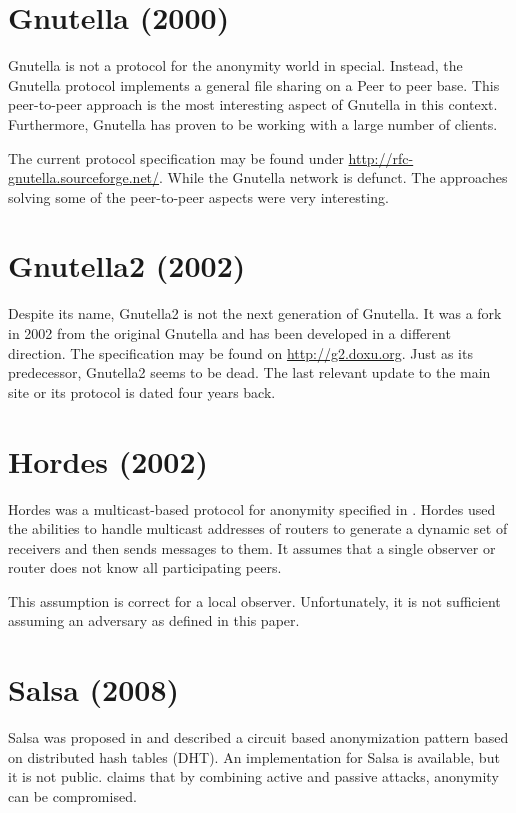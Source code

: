 \section{Gnutella (2000)}
Gnutella is not a protocol for the anonymity world in special. Instead, the Gnutella protocol implements a general file sharing on a Peer to peer base. This peer-to-peer approach is the most interesting aspect of Gnutella in this context. Furthermore, Gnutella has proven to be working with a large number of clients.

The current protocol specification may be found under \href{http://rfc-gnutella.sourceforge.net/developer/stable/index.html}{http://rfc-gnutella.sourceforge.net/}. While the Gnutella network is defunct. The approaches solving some of the peer-to-peer aspects were very interesting.

\section{Gnutella2 (2002)}
Despite its name, Gnutella2 is not the next generation of Gnutella. It was a fork in 2002 from the original Gnutella and has been developed in a different direction. The specification may be found on \url{http://g2.doxu.org}. Just as its predecessor, Gnutella2 seems to be dead. The last relevant update to the main site or its protocol is dated four years back.


\section{Hordes (2002)}
Hordes was a multicast-based protocol for anonymity specified in \cite{Levine:2002}. Hordes used the abilities to handle multicast addresses of routers to generate a dynamic set of receivers and then sends messages to them. It assumes that a single observer or router does not know all participating peers. 


This assumption is correct for a local observer. Unfortunately, it is not sufficient assuming an adversary as defined in this paper.

\section{Salsa (2008)}
Salsa was proposed in \cite{Salsa} and described a circuit based anonymization pattern based on distributed hash tables (DHT). An implementation for Salsa is available, but it is not public. \cite{ccs2008:mittal} claims that by combining active and passive attacks, anonymity can be compromised.

